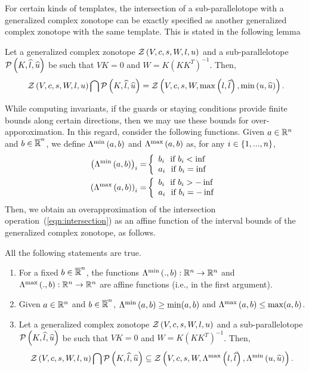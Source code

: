 For certain kinds of templates, the intersection of a
sub-parallelotope with a generalized complex zonotope can be exactly
specified as another generalized complex zonotope with the same
template.  This is stated in the following lemma 
\begin{lemma}
  Let a generalized complex zonotope $\mathcal{Z}\left(V,c,s,W,l,u\right)$ and a sub-parallelotope
  $\mathcal{P}\left(K,\widehat{l},\widehat{u}\right)$ be such that $VK=0$ and
  $W=K(KK^T)^{-1}$.  Then, 
\begin{equation}~\label{eqn:intersection}
\mathcal{Z}\left(V,c,s,W,l,u\right)\bigcap \mathcal{P}\left(K,\widehat{l},\widehat{u}\right) =
  \mathcal{Z}\left(V,c,s,W,\max\left(l,\widehat{l}\right),\min\left(u,\widehat{u}\right)\right).
\end{equation}
\end{lemma}

While computing invariants, if the guards or staying conditions
provide finite bounds along certain directions, then we may use these
bounds for over-apporoximation.  In this regard, consider the
following functions.  Given $a\in\mathbb{R}^n$ and $b\in\mathbb{\overline{R}}^n$,
we define $\Lambda^{\min}\left(a,b\right)$ and $\Lambda^{\max}\left(a,b\right)$ as, for any
$i\in\{1,...,n\}$,
\begin{align}
\left(\Lambda^{\min}\left(a,b\right)\right)_i= & \left\{
\begin{array}{l}
b_i~~\text{if}~b_i<\inf\\
a_i~~\text{if}~b_i=\inf
\end{array}
\right.\\
\left(\Lambda^{\max}\left(a,b\right)\right)_i= &\left\{
\begin{array}{l}
b_i~~\text{if}~b_i>-\inf\\
a_i~~\text{if}~b_i=-\inf
\end{array}
\right.
\end{align}
%
Then, we obtain an overapproximation of the intersection
operation~(\ref{eqn:intersection}) as an affine function of the
interval bounds of the generalized complex zonotope, as follows.
\begin{lemma}
All the following statements are true.
\begin{enumerate}
\item For a fixed $b\in\mathbb{\overline{R}}^n$, the functions
  $\Lambda^{\min}\left(.,b\right):\mathbb{R}^n\rightarrow\mathbb{R}^n$ and
  $\Lambda^{\max}\left(.,b\right):\mathbb{R}^n\rightarrow\mathbb{R}^n$ are affine functions
  (i.e., in
  the first argument).
\item Given $a\in\mathbb{R}^n$ and $b\in\mathbb{\overline{R}}^n$,
  $\Lambda^{\min}\left(a,b\right)\geq \min(a,b)$ and $\Lambda^{\max}\left(a,b\right)\leq
  \max(a,b)$.
\item Let a generalized complex zonotope $\mathcal{Z}\left(V,c,s,W,l,u\right)$ and a sub-parallelotope
  $\mathcal{P}\left(K,\widehat{l},\widehat{u}\right)$ be such that $VK=0$ and
  $W=K(KK^T)^{-1}$.  Then, \[\mathcal{Z}\left(V,c,s,W,l,u\right)\bigcap \mathcal{P}\left(K,\widehat{l},\widehat{u}\right) \subseteq
  \mathcal{Z}\left(V,c,s,W,\Lambda^{\max}\left(l,\widehat{l}\right),\Lambda^{\min}\left(u,\widehat{u}\right)\right).\]
\end{enumerate}
\end{lemma}



